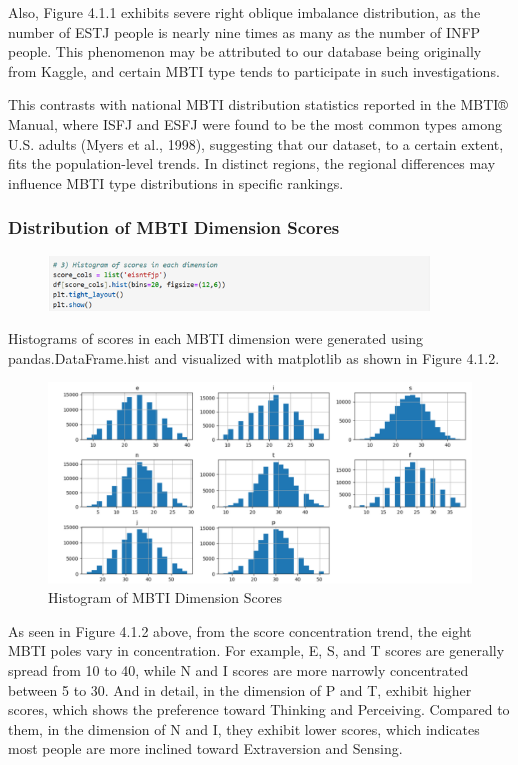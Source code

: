 \documentclass[12pt]{article}
\begin{document}
	Also, Figure 4.1.1 exhibits severe right oblique imbalance distribution, as the number of ESTJ people is nearly nine times as many as the number of INFP people. This phenomenon may be attributed to our database being originally from Kaggle, and certain MBTI type tends to participate in such investigations.
	
	This contrasts with national MBTI distribution statistics reported in the MBTI® Manual, where ISFJ and ESFJ were found to be the most common types among U.S. adults (Myers et al., 1998), suggesting that our dataset, to a certain extent, fits the population-level trends. In distinct regions, the regional differences may influence MBTI type distributions in specific rankings.
	
	\subsubsection{Distribution of MBTI Dimension Scores}
		\begin{figure}[H]
		\centering
		\includegraphics[width=0.9\textwidth]{Q1EDA3}
		
	\end{figure}
	
	Histograms of scores in each MBTI dimension were generated using pandas.DataFrame.hist and visualized with matplotlib as shown in Figure 4.1.2.
	\begin{figure}[H]
		\centering
		\includegraphics{Q1EDA4} 
		\caption{Histogram of MBTI Dimension Scores}		
	\end{figure}
	
	As seen in Figure 4.1.2 above, from the score concentration trend, the eight MBTI poles vary in concentration. For example, E, S, and T scores are generally spread from 10 to 40, while N and I scores are more narrowly concentrated between 5 to 30. And in detail, in the dimension of P and T, exhibit higher scores, which shows the preference toward Thinking and Perceiving. Compared to them, in the dimension of N and I, they exhibit lower scores, which indicates most people are more inclined toward Extraversion and Sensing.
	
\end{document}
